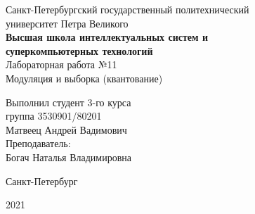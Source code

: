 \documentclass[a4paper]{article}
\begin{document}
    \begin{center}
        \begin{center}
        \hfill \break
        \normalsize{Санкт-Петербургский государственный политехнический}\\
        \normalsize{университет Петра Великого}\\
        \hfill \break
        \normalsize{\textbf{Высшая школа интеллектуальных систем и}}\\ 
        \normalsize{\textbf{суперкомпьютерных технологий}}\\ 
        \hfill \break
        \hfill \break
        \hfill \break
        \normalsize{Лабораторная работа №11}\\
        \hfill \break
        \hfill \break
        \normalsize{\LARGE Модуляция и выборка (квантование)}\\
        \end{center}
        \hfill \break
        \hfill \break
        \hfill \break
        \hfill \break
        \hfill \break
        \hfill \break
        \hfill \break
        \hfill \break
        \hfill \break
        \hfill \break
        \begin{flushright}
            \normalsize{Выполнил студент 3-го курса}\\
            \normalsize{группа 3530901/80201}\\
            \normalsize{Матвеец Андрей Вадимович}\\
            \hfill \break
            \normalsize{Преподаватель:}\\
            \normalsize{Богач Наталья Владимировна}\\
        \end{flushright}
        \hfill \break
        \hfill \break
        \hfill \break
        \hfill \break
        \begin{center} Санкт-Петербург\end{center}
        \begin{center}2021\end{center} 
        \thispagestyle{empty}
    \end{center}
    
    \newpage
        \tableofcontents
    
    \newpage
         \listoffigures
    
    \newpage
         \lstlistoflistings   
     
\end{document}
